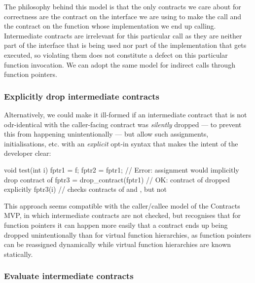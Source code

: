 The philosophy behind this model is that the only contracts we care about for correctness are the contract on the interface we are using to make the call and the contract on the function whose implementation we end up calling. Intermediate contracts are irrelevant for this particular call as they are neither part of the  interface that is being used nor part of the implementation that gets executed, so violating them does not constitute a defect on this particular function invocation. We can adopt the same model for indirect calls through function pointers.


\subsubsection{Explicitly drop intermediate contracts}
\label{explicitdrop}

Alternatively, we could make it ill-formed if an intermediate contract that is not odr-identical with the caller-facing contract was \emph{silently} dropped --- to prevent this from happening unintentionally --- but allow such assignments, initialisations, etc. with an \emph{explicit} opt-in syntax that makes the intent of the developer clear:
\begin{codeblock}
void test(int i) {
  fptr1 = f;
  fptr2 = fptr1;                // Error: assignment would implicitly drop contract of 
  fptr3 = drop_contract(fptr1)  // OK: contract of  dropped explicitly
  fptr3(i)                      // checks contracts of  and , but not 
}
\end{codeblock}
This approach seems compatible with the caller/callee model of the Contracts MVP, in which intermediate contracts are not checked, but recognises that for function pointers it can happen more easily that a contract ends up being dropped unintentionally than for virtual function hierarchies, as function pointers can be reassigned dynamically while virtual function hierarchies are known statically.


\subsubsection{Evaluate intermediate contracts}
\label{sticky}

